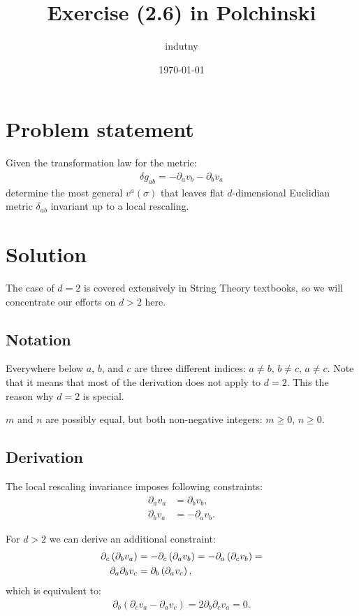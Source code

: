 \documentclass[aps,prd,final,twocolumn,floats,floatfix,nofootinbib,10pt]{revtex4-1}
\begin{document}
\title{Exercise (2.6) in Polchinski}
\author{indutny}
\date{\today}
\noaffiliation

\maketitle

\section{Problem statement}

Given the transformation law for the metric:
\begin{align}
  \delta g_{ab} = -\partial_a v_b - \partial_b v_a
\end{align}
determine the most general $v^a(\sigma)$ that leaves flat $d$-dimensional
Euclidian metric $\delta_{ab}$ invariant up to a local rescaling.

\section{Solution}

The case of $d = 2$ is covered extensively in String Theory textbooks, so we
will concentrate our efforts on $d > 2$ here.

\subsection{Notation}

Everywhere below $a$, $b$, and $c$ are three different indices:
$a \neq b$, $b \neq c$, $a \neq c$. Note that it means that most of the
derivation does not apply to $d = 2$. This the reason why $d = 2$ is special.

$m$ and $n$ are possibly equal, but both non-negative integers: $m \geq 0$,
$n \geq 0$.

\subsection{Derivation}

The local rescaling invariance imposes following constraints:
\begin{align}
  \partial_a v_a & = \partial_b v_b, \label{eq:diagonal} \\
  \partial_b v_a & = -\partial_a v_b \label{eq:off-diagonal}.
\end{align}

For $d > 2$ we can derive an additional constraint:
\begin{align}
  \partial_c \left( \partial_b v_a \right) & =
  -\partial_c \left( \partial_a v_b \right) =
  -\partial_a \left( \partial_c v_b \right) = \notag \\
  \partial_a \partial_b v_c & = \partial_b \left( \partial_a v_c \right),
\end{align}
which is equivalent to:
\begin{align} \label{eq:two-vars}
  \partial_b \left( \partial_c v_a - \partial_a v_c \right) =
  2 \partial_b \partial_c v_a = 0.
\end{align}
\end{document}
